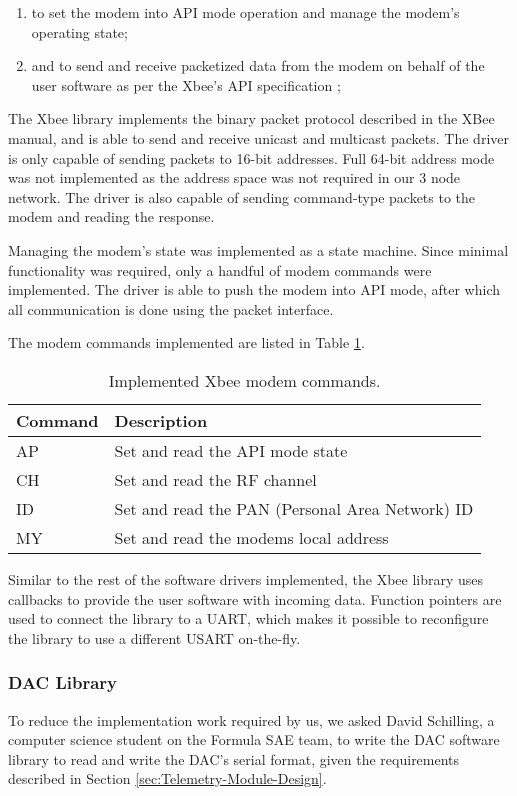 \begin{enumerate}
\item to set the modem into API mode operation and manage the modem's operating state;
\item and to send and receive packetized data from the modem on behalf of the user software as per the Xbee's API specification \cite{XBeeManual};
\end{enumerate}

The Xbee library implements the binary packet protocol described in the XBee manual, and is able to send and receive unicast and multicast packets. The driver is only capable of sending packets to 16-bit addresses. Full 64-bit address mode was not implemented as the address space was not required in our 3 node network. The driver is also capable of sending command-type packets to the modem and reading the response.

Managing the modem's state was implemented as a state machine. Since minimal functionality was required, only a handful of modem commands were implemented. The driver is able to push the modem into API mode, after which all communication is done using the packet interface.

The modem commands implemented are listed in Table \ref{tab:xbee_commands}.

\begin{table}
\caption{Implemented Xbee modem commands.\label{tab:xbee_commands}}
\centering{}
\begin{tabular}{|l|l|}
\hline 
Command & Description \tabularnewline
\hline
\hline
AP & Set and read the API mode state \tabularnewline
\hline
CH & Set and read the RF channel \tabularnewline
\hline 
ID & Set and read the PAN (Personal Area Network) ID \tabularnewline
\hline
MY & Set and read the modems local address \tabularnewline
\hline
\end{tabular}
\end{table}

Similar to the rest of the software drivers implemented, the Xbee library uses callbacks to provide the user software with incoming data. Function pointers are used to connect the library to a UART, which makes it possible to reconfigure the library to use a different USART on-the-fly.

\subsubsection{DAC Library}

To reduce the implementation work required by us, we asked David Schilling, a computer science student on the Formula SAE team, to write the DAC software library to read and write the DAC's serial format, given the requirements described in Section \ref{sec:Telemetry-Module-Design}.

